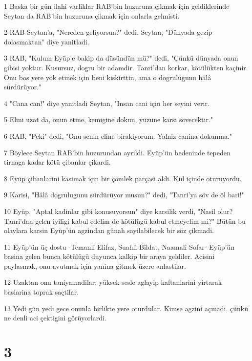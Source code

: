 \par 1 Baska bir gün ilahi varliklar RAB'bin huzuruna çikmak için geldiklerinde Seytan da RAB'bin huzuruna çikmak için onlarla gelmisti.
\par 2 RAB Seytan'a, "Nereden geliyorsun?" dedi. Seytan, "Dünyada gezip dolasmaktan" diye yanitladi.
\par 3 RAB, "Kulum Eyüp'e bakip da düsündün mü?" dedi, "Çünkü dünyada onun gibisi yoktur. Kusursuz, dogru bir adamdir. Tanri'dan korkar, kötülükten kaçinir. Onu bos yere yok etmek için beni kiskirttin, ama o dogrulugunu hâlâ sürdürüyor."
\par 4 "Cana can!" diye yanitladi Seytan, "Insan cani için her seyini verir.
\par 5 Elini uzat da, onun etine, kemigine dokun, yüzüne karsi sövecektir."
\par 6 RAB, "Peki" dedi, "Onu senin eline birakiyorum. Yalniz canina dokunma."
\par 7 Böylece Seytan RAB'bin huzurundan ayrildi. Eyüp'ün bedeninde tepeden tirnaga kadar kötü çibanlar çikardi.
\par 8 Eyüp çibanlarini kasimak için bir çömlek parçasi aldi. Kül içinde oturuyordu.
\par 9 Karisi, "Hâlâ dogrulugunu sürdürüyor musun?" dedi, "Tanri'ya söv de öl bari!"
\par 10 Eyüp, "Aptal kadinlar gibi konusuyorsun" diye karsilik verdi, "Nasil olur? Tanri'dan gelen iyiligi kabul edelim de kötülügü kabul etmeyelim mi?" Bütün bu olaylara karsin Eyüp'ün agzindan günah sayilabilecek bir söz çikmadi.
\par 11 Eyüp'ün üç dostu -Temanli Elifaz, Suahli Bildat, Naamali Sofar- Eyüp'ün basina gelen bunca kötülügü duyunca kalkip bir araya geldiler. Acisini paylasmak, onu avutmak için yanina gitmek üzere anlastilar.
\par 12 Uzaktan onu taniyamadilar; yüksek sesle aglayip kaftanlarini yirtarak baslarina toprak saçtilar.
\par 13 Yedi gün yedi gece onunla birlikte yere oturdular. Kimse agzini açmadi, çünkü ne denli aci çektigini görüyorlardi.

\chapter{3}

